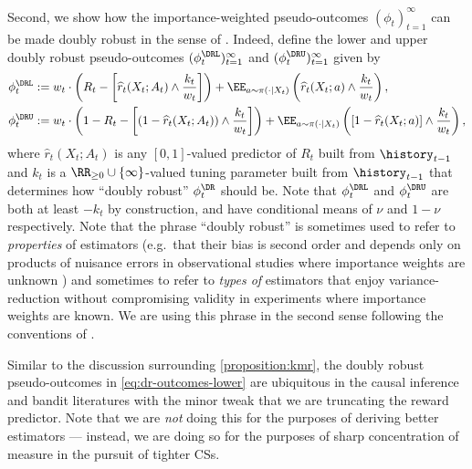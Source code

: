 Second, we show how the importance-weighted pseudo-outcomes $(\phi_t)_{t=1}^\infty$ can be made doubly robust in the sense of \citet{dudik2011doubly,dudik2014doubly}. Indeed, define the lower and upper doubly robust pseudo-outcomes $(\phi_t^\DRL)_{t=1}^\infty$ and $(\phi_t^\DRU)_{t=1}^\infty$ given by
\begin{align}
  \phi_t^\DRL &:= w_t \cdot \left (R_t - \left [ \widehat r_t(X_t; A_t) \land \frac{k_t}{w_t} \right ] \right ) + \EE_{a \sim \pi(\cdot \mid X_t)} \left ( \widehat r_t(X_t; a) \land \frac{k_t}{w_t} \right ) , \label{eq:dr-outcomes-lower}\\
  \phi_t^\DRU &:= w_t \cdot \left (1-R_t - \left [ (1-\widehat r_t(X_t; A_t)) \land \frac{k_t}{w_t} \right ] \right ) + \EE_{a \sim \pi(\cdot \mid X_t)} \left ( [1-\widehat r_t(X_t; a) ]\land \frac{k_t}{w_t} \right ) , \label{eq:dr-outcomes-upper}
\end{align}
where $\widehat r_t(X_t ; A_t)$ is any $[0, 1]$-valued predictor of $R_t$ built from $\history_{t-1}$ and $k_t$ is a $\RR_{\geq 0}\cup \{\infty\}$-valued tuning parameter built from $\history_{t-1}$ that determines how ``doubly robust'' $\phi_t^\DR$ should be. Note that $\phi_t^\DRL$ and $\phi_t^\DRU$ are both at least $-k_t$ by construction, and have conditional means of $\nu$ and $1-\nu$ respectively. Note that the phrase ``doubly robust'' is sometimes used to refer to \textit{properties} of estimators (e.g.~that their bias is second order and depends only on products of nuisance errors in observational studies where importance weights are unknown \citep{kennedy2022semiparametric}) and sometimes to refer to \emph{types of} estimators that enjoy variance-reduction without compromising validity in experiments where importance weights are known. We are using this phrase in the second sense following the conventions of \citet{dudik2011doubly,dudik2014doubly}. 

Similar to the discussion surrounding \cref{proposition:kmr}, the doubly robust pseudo-outcomes in \eqref{eq:dr-outcomes-lower} are ubiquitous in the causal inference and bandit literatures \citep{robins1994estimation,dudik2011doubly,dudik2014doubly,uehara2022review} with the minor tweak that we are truncating the reward predictor. Note that we are \emph{not} doing this for the purposes of deriving better estimators --- instead, we are doing so for the purposes of sharp concentration of measure in the pursuit of tighter CSs.

